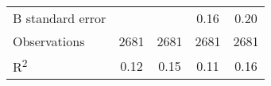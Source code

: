 \begin{tabular}{lcccc}
  \hspace{10mm} B standard error            &                             &                           & 0.16                      & 0.20                      \\
  Observations                              & 2681                        & 2681                      & 2681                      & 2681                      \\
  R\textsuperscript{2}                      & 0.12                        & 0.15                      & 0.11                      & 0.16                      \\ \bottomrule
\end{tabular}
\normalsize
